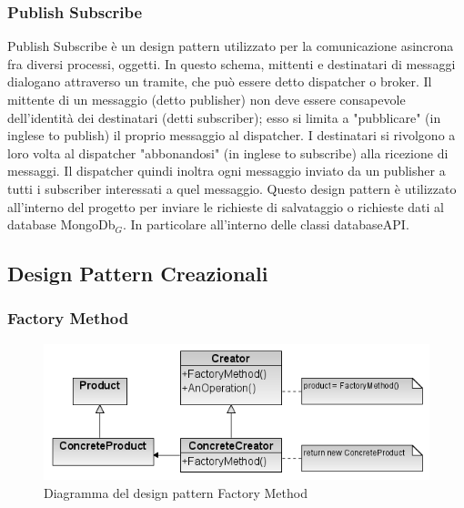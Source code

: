 \subsubsection{Publish Subscribe}

Publish Subscribe è un design pattern utilizzato per la comunicazione asincrona fra diversi processi, oggetti. In questo schema, mittenti e destinatari di messaggi dialogano attraverso un tramite, che può essere detto dispatcher o broker. Il mittente di un messaggio (detto publisher) non deve essere consapevole dell'identità dei destinatari (detti subscriber); esso si limita a "pubblicare" (in inglese to publish) il proprio messaggio al dispatcher. I destinatari si rivolgono a loro volta al dispatcher "abbonandosi" (in inglese to subscribe) alla ricezione di messaggi. Il dispatcher quindi inoltra ogni messaggio inviato da un publisher a tutti i subscriber interessati a quel messaggio.
Questo design pattern è utilizzato all'interno del progetto per inviare le richieste di salvataggio o richieste dati al database MongoDb$_G$. In particolare all'interno delle classi databaseAPI.

\subsection{Design Pattern Creazionali}

\subsubsection{Factory Method}

\begin{figure}[h]
\begin{center}
\includegraphics[scale=0.4]{img/Factory.png}
\caption{Diagramma del design pattern Factory Method}
\end{center}
\end{figure}

